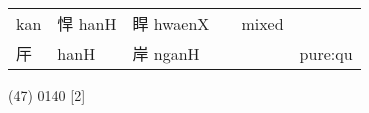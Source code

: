 \documentclass[14pt,a4paper]{scrartcl}
\begin{document}
\begin{longtable}[c]{@{}llllll@{}}
\begin{minipage}[t]{0.14\columnwidth}\raggedright\strut
kan
\strut\end{minipage} &
\begin{minipage}[t]{0.14\columnwidth}\raggedright\strut
悍 hanH
\strut\end{minipage} &
\begin{minipage}[t]{0.14\columnwidth}\raggedright\strut
睅 hwaenX
\strut\end{minipage} &
\begin{minipage}[t]{0.14\columnwidth}\raggedright\strut
\strut\end{minipage} &
\begin{minipage}[t]{0.14\columnwidth}\raggedright\strut
mixed
\strut\end{minipage}\tabularnewline
\begin{minipage}[t]{0.14\columnwidth}\raggedright\strut
厈
\strut\end{minipage} &
\begin{minipage}[t]{0.14\columnwidth}\raggedright\strut
hanH
\strut\end{minipage} &
\begin{minipage}[t]{0.14\columnwidth}\raggedright\strut
岸 nganH
\strut\end{minipage} &
\begin{minipage}[t]{0.14\columnwidth}\raggedright\strut
\strut\end{minipage} &
\begin{minipage}[t]{0.14\columnwidth}\raggedright\strut
\strut\end{minipage} &
\begin{minipage}[t]{0.14\columnwidth}\raggedright\strut
pure:qu
\strut\end{minipage}\tabularnewline
\bottomrule
\end{longtable}

(47) 0140 {[}2{]}
\end{document}
